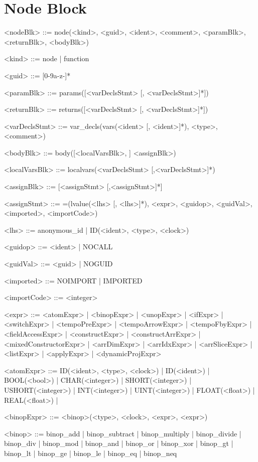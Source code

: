 \documentclass{article}
\begin{document}
\section{Node Block}
\begin{grammar} \small

<nodeBlk> ::= node(<kind>, <guid>, <ident>, <comment>, <paramBlk>, <returnBlk>, <bodyBlk>)

<kind> ::= node | function

<guid> ::= [0-9a-z-]*

<paramBlk> ::= params([<varDeclsStmt> [, <varDeclsStmt>]*])

<returnBlk> ::= returns([<varDeclsStmt> [, <varDeclsStmt>]*])

<varDeclsStmt> ::= var_decls(vars(<ident> [, <ident>]*), <type>, <comment>)

<bodyBlk> ::= body([<localVarsBlk>, ] <assignBlk>)

<localVarsBlk> ::= localvars(<varDeclsStmt> [,<varDeclsStmt>]*)

<assignBlk> ::= [<assignStmt> [,<assignStmt>]*]

<assignStmt> ::= =(lvalue(<lhs> [, <lhs>]*), <expr>, <guidop>, <guidVal>, <imported>, <importCode>)

<lhs> ::= anonymous_id | ID(<ident>, <type>, <clock>)

<guidop> ::= <ident> | NOCALL

<guidVal> ::= <guid> | NOGUID

<imported> ::= NOIMPORT | IMPORTED

<importCode> ::= <integer>

<expr> ::= <atomExpr> | <binopExpr> | <unopExpr> |
           <ifExpr> | <switchExpr> |
           <tempoPreExpr> | <tempoArrowExpr> | <tempoFbyExpr> |
           <fieldAccessExpr> | <constructExpr> | <constructArrExpr> | <mixedConstructorExpr> |
           <arrDimExpr> | <arrIdxExpr> | <arrSliceExpr> |
           <listExpr> | <applyExpr> | <dynamicProjExpr>

<atomExpr> ::= ID(<ident>, <type>, <clock>) | ID(<ident>) | BOOL(<bool>) | CHAR(<integer>) | SHORT(<integer>) | USHORT(<integer>) |
               INT(<integer>) | UINT(<integer>) | FLOAT(<float>) | REAL(<float>) |

<binopExpr> ::= <binop>(<type>, <clock>, <expr>, <expr>)

<binop> ::= binop_add | binop_subtract | binop_multiply |
            binop_divide | binop_div | binop_mod |
            binop_and | binop_or | binop_xor |
            binop_gt | binop_lt | binop_ge | binop_le |
            binop_eq | binop_neq


\end{grammar}
\end{document}
